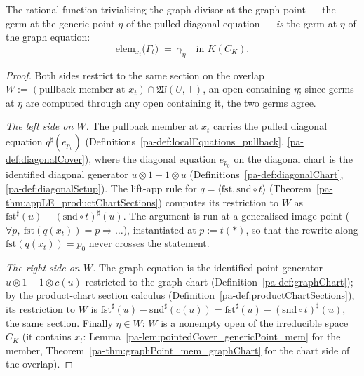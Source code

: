 \begin{theorem}
  \label{pa-thm:presentationElem_graphLocalEquations_val}
  \leanok

  The rational function trivialising the graph divisor at the graph point — the germ at the
  generic point \(\eta\) of the pulled diagonal equation — \emph{is} the germ at \(\eta\)
  of the graph equation:
  \[
    \mathrm{elem}_{x_t}\bigl(\Gamma_t\bigr)
      \;=\; \gamma_\eta \quad\text{in } K(C_K).
  \]
\end{theorem}
\begin{proof}
  \leanok
  Both sides restrict to the same section on the overlap
  \(W := (\text{pullback member at } x_t) \cap \mathfrak W(U, \top)\), an open containing
  \(\eta\); since germs at \(\eta\) are computed through any open containing it, the two
  germs agree.

  \emph{The left side on \(W\).} The pullback member at \(x_t\) carries the pulled
  diagonal equation \(q^{\sharp}(e_{p_0})\) (Definitions~\ref{pa-def:localEquations_pullback},
  \ref{pa-def:diagonalCover}), where the diagonal equation \(e_{p_0}\) on the diagonal chart
  is the identified diagonal generator \(u \otimes 1 - 1 \otimes u\)
  (Definitions~\ref{pa-def:diagonalChart}, \ref{pa-def:diagonalSetup}). The lift-app rule for
  \(q = \langle\mathrm{fst}, \mathrm{snd}\circ t\rangle\)
  (Theorem~\ref{pa-thm:appLE_productChartSections}) computes its restriction to \(W\) as
  \(\mathrm{fst}^{\sharp}(u) - (\mathrm{snd}\circ t)^{\sharp}(u)\). The argument is run at
  a generalised image point (\(\forall p,\ \mathrm{fst}(q(x_t)) = p \Rightarrow \dots\)),
  instantiated at \(p := t(\ast)\), so that the rewrite along
  \(\mathrm{fst}(q(x_t)) = p_0\) never crosses the statement.

  \emph{The right side on \(W\).} The graph equation is the identified point generator
  \(u \otimes 1 - 1 \otimes c(u)\) restricted to the graph chart
  (Definition~\ref{pa-def:graphChart}); by the product-chart section calculus
  (Definition~\ref{pa-def:productChartSections}), its restriction to \(W\) is
  \(\mathrm{fst}^{\sharp}(u) - \mathrm{snd}^{\sharp}(c(u))
    = \mathrm{fst}^{\sharp}(u) - (\mathrm{snd} \circ t)^{\sharp}(u)\),
  the same section. Finally \(\eta \in W\): \(W\) is a nonempty open of the irreducible
  space \(C_K\) (it contains \(x_t\):
  Lemma~\ref{pa-lem:pointedCover_genericPoint_mem} for the member,
  Theorem~\ref{pa-thm:graphPoint_mem_graphChart} for the chart side of the overlap).
\end{proof}

